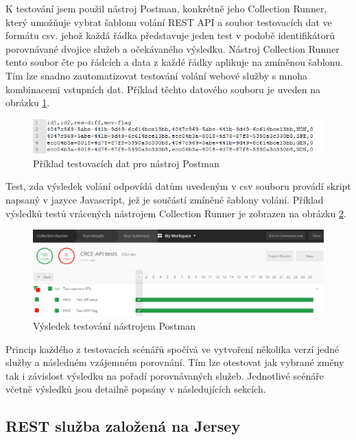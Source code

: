 \documentclass[czech,DP]{thesiskiv}
\begin{document}
K testování jsem použil nástroj Postman, konkrétně jeho Collection Runner, který umožňuje vybrat šablonu volání REST API a soubor testovacích dat ve formátu csv. jehož každá řádka představuje jeden test v podobě identifikátorů porovnávané dvojice služeb a očekávaného výsledku. Nástroj Collection Runner tento soubor čte po řádcích a data z každé řádky aplikuje na zmíněnou šablonu. Tím lze snadno zautomatizovat testování volání webové služby s mnoha kombinacemi vstupních dat. Příklad těchto datového souboru je uveden na obrázku \ref{fig:test-data-csv}. 

\begin{figure}[h]
	\centering
	\includegraphics[width=\linewidth]{test-data-csv.png}
	\caption{Příklad testovacích dat pro nástroj Postman}
	\label{fig:test-data-csv}
\end{figure}

Test, zda výsledek volání odpovídá datům uvedeným v csv souboru provádí skript napsaný v jazyce Javascript, jež je součástí zmíněné šablony volání. Příklad výsledků testů vrácených nástrojem Collection Runner je zobrazen na obrázku \ref{fig:test-results}.

\begin{figure}[h]
	\centering
	\includegraphics[width=\linewidth]{test-results.png}
	\caption{Výsledek testování nástrojem Postman}
	\label{fig:test-results}
\end{figure}


Princip každého z testovacích scénářů spočívá ve vytvoření několika verzí jedné služby a následném vzájemném porovnání. Tím lze otestovat jak vybrané změny tak i závislost výsledku na pořadí porovnávaných služeb. Jednotlivé scénáře včetně výsledků jsou detailně popsány v následujících sekcích.

\subsection{REST služba založená na Jersey}
\end{document}
